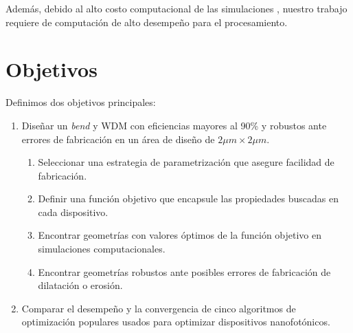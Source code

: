 Además, debido al alto costo computacional de las simulaciones \citep{Schneider2019}, nuestro trabajo requiere de computación de alto desempeño para el procesamiento.

\section{Objetivos}

Definimos dos objetivos principales:

\begin{enumerate}

  \item Diseñar un \emph{bend} y WDM con eficiencias mayores al 90\% y robustos ante errores de fabricación en un área de diseño de $2 \mu m \times 2 \mu m$. 

  \begin{enumerate}

    \item Seleccionar una estrategia de parametrización que asegure facilidad de fabricación.

    \item Definir una función objetivo que encapsule las propiedades buscadas en cada dispositivo.

    \item Encontrar geometrías con valores óptimos de la función objetivo en simulaciones computacionales.

    \item Encontrar geometrías robustos ante posibles errores de fabricación de dilatación o erosión.

  \end{enumerate}

  \item Comparar el desempeño y la convergencia de cinco algoritmos de optimización populares usados para optimizar dispositivos nanofotónicos.

\end{enumerate}
